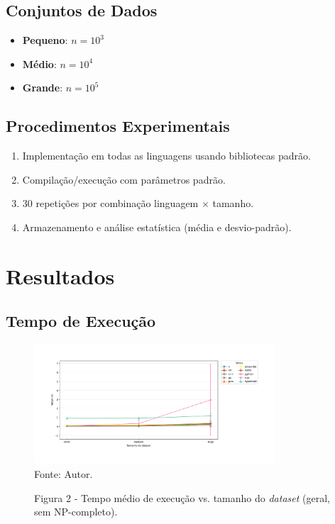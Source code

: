 \documentclass[12pt,a4paper]{article}
\newcommand{\eng}[1]{\textit{#1}}
\begin{document}
\subsection{Conjuntos de Dados}
\begin{itemize}
  \item \textbf{Pequeno}: \(n=10^3\)
  \item \textbf{Médio}: \(n=10^4\)
  \item \textbf{Grande}: \(n=10^5\)
\end{itemize}

\subsection{Procedimentos Experimentais}
\begin{enumerate}
  \item Implementação em todas as linguagens usando bibliotecas padrão.
  \item Compilação/execução com parâmetros padrão.
  \item 30 repetições por combinação linguagem $\times$ tamanho.
  \item Armazenamento e análise estatística (média e desvio-padrão).
\end{enumerate}



\section{Resultados}

\subsection{Tempo de Execução}
\begin{figure}[H]
  \caption{Figura 2 - Tempo médio de execução vs. tamanho do \eng{dataset} (geral, sem NP-completo).}
  \centering
  \includegraphics[width=0.8\textwidth]{img/tempo_vs_tamanho_all.png}
  \label{fig:tempo_execucao}
  \\ \small Fonte: Autor.
\end{figure}
\end{document}

